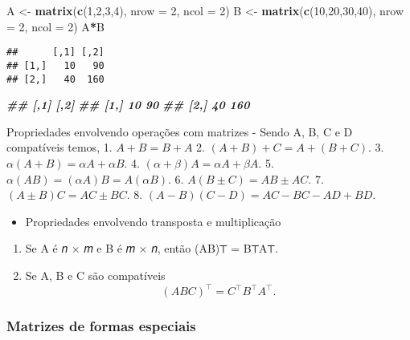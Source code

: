 \documentclass[
]{article}
\newenvironment{Shaded}{\begin{snugshade}}{\end{snugshade}}
\newcommand{\AttributeTok}[1]{\textcolor[rgb]{0.13,0.29,0.53}{#1}}
\newcommand{\DecValTok}[1]{\textcolor[rgb]{0.00,0.00,0.81}{#1}}
\newcommand{\DocumentationTok}[1]{\textcolor[rgb]{0.56,0.35,0.01}{\textbf{\textit{#1}}}}
\newcommand{\FunctionTok}[1]{\textcolor[rgb]{0.13,0.29,0.53}{\textbf{#1}}}
\newcommand{\NormalTok}[1]{#1}
\newcommand{\OtherTok}[1]{\textcolor[rgb]{0.56,0.35,0.01}{#1}}
\newcommand{\SpecialCharTok}[1]{\textcolor[rgb]{0.81,0.36,0.00}{\textbf{#1}}}
\providecommand{\tightlist}{%
  \setlength{\itemsep}{0pt}\setlength{\parskip}{0pt}}
\begin{document}
\begin{Shaded}
\begin{Highlighting}[]
\NormalTok{A }\OtherTok{\textless{}{-}} \FunctionTok{matrix}\NormalTok{(}\FunctionTok{c}\NormalTok{(}\DecValTok{1}\NormalTok{,}\DecValTok{2}\NormalTok{,}\DecValTok{3}\NormalTok{,}\DecValTok{4}\NormalTok{),}
\AttributeTok{nrow =} \DecValTok{2}\NormalTok{, }\AttributeTok{ncol =} \DecValTok{2}\NormalTok{)}
\NormalTok{B }\OtherTok{\textless{}{-}} \FunctionTok{matrix}\NormalTok{(}\FunctionTok{c}\NormalTok{(}\DecValTok{10}\NormalTok{,}\DecValTok{20}\NormalTok{,}\DecValTok{30}\NormalTok{,}\DecValTok{40}\NormalTok{),}
\AttributeTok{nrow =} \DecValTok{2}\NormalTok{, }\AttributeTok{ncol =} \DecValTok{2}\NormalTok{)}
\NormalTok{A}\SpecialCharTok{*}\NormalTok{B}
\end{Highlighting}
\end{Shaded}

\begin{verbatim}
##      [,1] [,2]
## [1,]   10   90
## [2,]   40  160
\end{verbatim}

\begin{Shaded}
\begin{Highlighting}[]
\DocumentationTok{\#\# [,1] [,2]}
\DocumentationTok{\#\# [1,] 10 90}
\DocumentationTok{\#\# [2,] 40 160}
\end{Highlighting}
\end{Shaded}

Propriedades envolvendo operações com matrizes - Sendo A, B, C e D
compatíveis temos, 1. \(A + B = B + A\) 2.
\((A + B) + C = A + (B + C)\). 3. \(𝛼(A + B) = 𝛼A + 𝛼B\). 4.
\((𝛼 + 𝛽)A = 𝛼A + 𝛽A\). 5. \(𝛼(AB) = (𝛼A)B = A(𝛼B)\). 6.
\(A(B ± C) = AB ± AC\). 7. \((A ± B)C = AC ± BC\). 8.
\((A−B)(C−D) = AC−BC−AD+BD\).

\begin{itemize}
\tightlist
\item
  Propriedades envolvendo transposta e multiplicação
\end{itemize}

\begin{enumerate}
\def\labelenumi{\arabic{enumi}.}
\tightlist
\item
  Se A é 𝑛 × 𝑚 e B é 𝑚 × 𝑛, então (AB)⊤ = B⊤A⊤.
\item
  Se A, B e C são compatíveis \[
  (ABC)^{⊤}= C^{⊤}B^{⊤}A^{⊤}.
  \]
\end{enumerate}

\hypertarget{matrizes-de-formas-especiais}{%
\subsubsection{Matrizes de formas
especiais}\label{matrizes-de-formas-especiais}}
\end{document}
